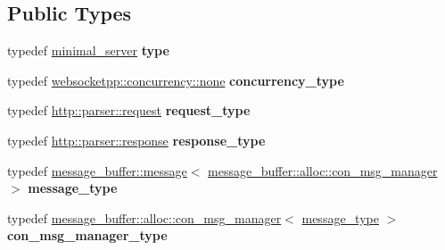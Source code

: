 \subsection*{Public Types}
\begin{DoxyCompactItemize}
\item 
\mbox{\label{structwebsocketpp_1_1config_1_1minimal__server_a2b417043c646c203ae97af495f5bc3b4}} 
typedef \mbox{\hyperlink{structwebsocketpp_1_1config_1_1minimal__server}{minimal\+\_\+server}} {\bfseries type}
\item 
\mbox{\label{structwebsocketpp_1_1config_1_1minimal__server_a54e2bde35814bd82607f618aacd3ec88}} 
typedef \mbox{\hyperlink{classwebsocketpp_1_1concurrency_1_1none}{websocketpp\+::concurrency\+::none}} {\bfseries concurrency\+\_\+type}
\item 
\mbox{\label{structwebsocketpp_1_1config_1_1minimal__server_a7b07ee40c2b25c39fb8e333f969df8e3}} 
typedef \mbox{\hyperlink{classwebsocketpp_1_1http_1_1parser_1_1request}{http\+::parser\+::request}} {\bfseries request\+\_\+type}
\item 
\mbox{\label{structwebsocketpp_1_1config_1_1minimal__server_a19b0c06176d183a59e47bfe065b132ff}} 
typedef \mbox{\hyperlink{classwebsocketpp_1_1http_1_1parser_1_1response}{http\+::parser\+::response}} {\bfseries response\+\_\+type}
\item 
\mbox{\label{structwebsocketpp_1_1config_1_1minimal__server_aecd1340269c1429fe37f042ec4b3cfac}} 
typedef \mbox{\hyperlink{classwebsocketpp_1_1message__buffer_1_1message}{message\+\_\+buffer\+::message}}$<$ \mbox{\hyperlink{classwebsocketpp_1_1message__buffer_1_1alloc_1_1con__msg__manager}{message\+\_\+buffer\+::alloc\+::con\+\_\+msg\+\_\+manager}} $>$ {\bfseries message\+\_\+type}
\item 
\mbox{\label{structwebsocketpp_1_1config_1_1minimal__server_a005ebd181cca0e5adb553146733870b5}} 
typedef \mbox{\hyperlink{classwebsocketpp_1_1message__buffer_1_1alloc_1_1con__msg__manager}{message\+\_\+buffer\+::alloc\+::con\+\_\+msg\+\_\+manager}}$<$ \mbox{\hyperlink{classwebsocketpp_1_1message__buffer_1_1message}{message\+\_\+type}} $>$ {\bfseries con\+\_\+msg\+\_\+manager\+\_\+type}

\end{DoxyCompactItemize}
